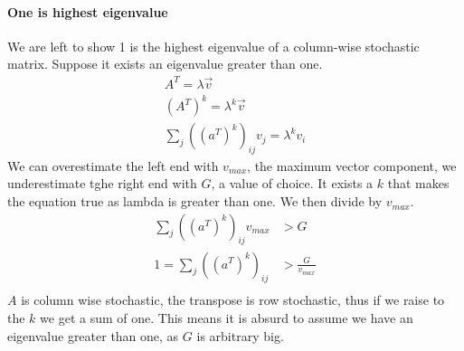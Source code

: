 \paragraph{One is highest eigenvalue}
We are left to show 1 is the highest eigenvalue of a column-wise stochastic matrix. Suppose it exists an eigenvalue greater than one.
\begin{equation}
    \begin{aligned}
        A^T = \lambda\vec{v}\\
        (A^T)^k = \lambda^k\vec{v} \\
        \sum_j((a^T)^k)_{ij}v_j = \lambda^kv_i
    \end{aligned}
\end{equation}
We can overestimate the left end with $v_\mathit{max}$, the maximum vector component, we underestimate tghe right end with $G$, a value of choice. 
It exists a $k$ that makes the equation true as lambda is greater than one. We then divide by $v_\mathit{max}$.
\begin{equation}
    \begin{aligned}
        \sum_j((a^T)^k)_{ij}v_\mathit{max} &> G\\
        1 = \sum_j((a^T)^k)_{ij} &> \frac{G}{v_\mathit{max}}\\
    \end{aligned}
\end{equation}
$A$ is column wise stochastic, the transpose is row stochastic, thus if we raise to the $k$ we get a sum of one. 
This means it is absurd to assume we have an eigenvalue greater than one, as $G$ is arbitrary big.